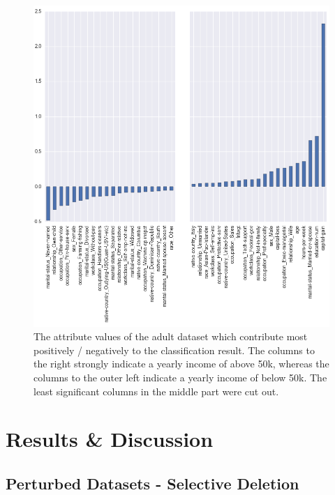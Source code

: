 \documentclass{llncs}
\begin{document}
\begin{figure}[!t]
	\begin{center}
		\vspace{-1.0cm}
    	\hspace*{-0.8cm}
		\includegraphics[width=1.1\textwidth]{figures/theory/important_columns_cut}
		\caption{The attribute values of the adult dataset which contribute most positively / negatively to the classification result. The columns to the right strongly indicate a yearly income of above 50k, whereas the columns to the outer left indicate a yearly income of below 50k. The least significant columns in the middle part were cut out.}
		\label{fig:adult_important_columns}
	\end{center}
\end{figure}


\section{Results \& Discussion}
\label{sect:results}


\subsection{Perturbed Datasets - Selective Deletion}
\label{ssect:selective_deletion}
\end{document}

